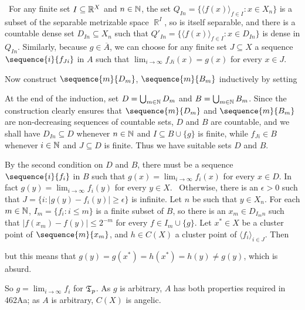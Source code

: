 {

\noindent\Prf\ For any finite set $I\subseteq\Bbb R^X$ and $n\in\Bbb N$,
the set $Q_{In}=\{\langle f(x)\rangle_{f\in I}:x\in X_n\}$ is a subset
of the separable metrizable space $\BbbR^I$, so is itself separable, and
there is a countable dense set $D_{In}\subseteq X_n$ such that
$Q'_{In}=\{\langle f(x)\rangle_{f\in I}:x\in D_{In}\}$ is dense in
$Q_{In}$.   Similarly, because $g\in\overline{A}$, we can choose for any
finite set $J\subseteq X$ a sequence $\sequence{i}{f_{Ji}}$ in $A$ such
that $\lim_{i\to\infty}f_{Ji}(x)=g(x)$ for every $x\in J$.

Now construct $\sequence{m}{D_m}$, $\sequence{m}{B_m}$ inductively by
setting



\noindent At the end of the induction, set $D=\bigcup_{m\in\Bbb N}D_m$
and $B=\bigcup_{m\in\Bbb N}B_m$.   Since the construction clearly
ensures that $\sequence{m}{D_m}$ and $\sequence{m}{B_m}$ are
non-decreasing sequences of countable sets, $D$ and $B$ are countable,
and we shall have $D_{In}\subseteq D$ whenever $n\in\Bbb N$ and
$I\subseteq B\cup\{g\}$ is finite, while $f_{Ji}\in B$ whenever
$i\in\Bbb N$ and $J\subseteq D$ is finite.   Thus we have suitable sets
$D$ and $B$.\ \Qed

By the second condition on $D$ and $B$, there must be a sequence
$\sequence{i}{f_i}$ in $B$ such that $g(x)=\lim_{i\to\infty}f_i(x)$ for
every $x\in D$.   In fact $g(y)=\lim_{i\to\infty}f_i(y)$ for every $y\in
X$.   \Prf\Quer\ Otherwise, there is an $\epsilon>0$ such that
$J=\{i:|g(y)-f_i(y)|\ge\epsilon\}$ is infinite.   Let $n$ be such that
$y\in X_n$.   For each $m\in\Bbb N$, $I_m=\{f_i:i\le m\}$ is a finite
subset of $B$, so there is an $x_m\in D_{I_mn}$ such that
$|f(x_m)-f(y)|\le 2^{-m}$ for every $f\in I_m\cup\{g\}$.   Let
$x^*\in X$ be a cluster point of $\sequence{m}{x_m}$, and
$h\in C(X)$ a cluster point of $\langle f_i\rangle_{i\in J}$.   Then





\noindent but this means that $g(y)=g(x^*)=h(x^*)=h(y)\ne g(y)$, which is
absurd.\ \Bang\Qed

So $g=\lim_{i\to\infty}f_i$ for $\frak T_p$.   As $g$ is arbitrary, $A$
has both properties required in 462Aa;  as $A$ is arbitrary, $C(X)$ is
angelic.
}%

